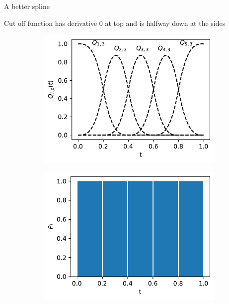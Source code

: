 \documentclass[../Thesis.tex]{subfiles}
\begin{document}
\begin{figure}[h]
    \centering
    
    \caption{}
    \label{fig:spline order 0 - Q}
\end{figure}

A better spline

\begin{figure}[h]
    \centering
    
    \caption{}
    \label{fig:spline order 0 - Q - step 2}
\end{figure}

Cut off function has derivative 0 at top and is halfway down at the sides
\begin{figure}[h]
    \centering
    \begin{subfigure}[t]{0.49\textwidth}
        \centering
        \includegraphics[width=\linewidth]{figures/MI estimation/Q-spline basis functions - degree 3.pdf}
        \caption{}
    \end{subfigure}
    \hfill
    \begin{subfigure}[t]{0.49\textwidth}
        \centering
        \includegraphics[width=\linewidth]{figures/MI estimation/Q-spline marginal dist - degree 3.pdf}

\end{subfigure}
\end{figure}
\end{document}
